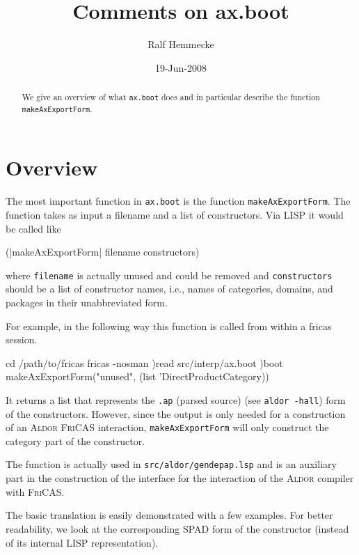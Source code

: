 \documentclass{article}
\newcommand{\file}[1]{\texttt{#1}}
\newcommand{\xAldor}{\textsc{Aldor}}
\newcommand{\xFriCAS}{\textsc{FriCAS}}
\begin{document}
\title{Comments on ax.boot}
\author{Ralf Hemmecke}
\date{19-Jun-2008}
\maketitle
\begin{abstract}
  We give an overview of what \file{ax.boot} does and in particular
  describe the function \verb'makeAxExportForm'.
\end{abstract}
\tableofcontents

\section{Overview}
The most important function in \file{ax.boot} is the function
\verb'makeAxExportForm'.
%
The function takes as input a filename and a list of constructors.
Via LISP it would be called like
\begin{code}
(|makeAxExportForm| filename constructors)
\end{code}
where \verb'filename' is actually unused and could be removed and
\verb'constructors' should be a list of constructor names, i.e., names
of categories, domains, and packages in their unabbreviated form.

For example, in the following way this function is called from within
a fricas session.
\begin{code}
cd /path/to/fricas
fricas -nosman
)read src/interp/ax.boot
)boot makeAxExportForm("unused", (list 'DirectProductCategory))
\end{code}

It returns a list that represents the \texttt{.ap} (parsed source)
(see \verb'aldor -hall') form of the constructors. However, since the
output is only needed for a construction of an \xAldor{} \xFriCAS{}
interaction, \verb'makeAxExportForm' will only construct the category
part of the constructor.

The function is actually used in \file{src/aldor/gendepap.lsp} and is an
auxiliary part in the construction of the interface for the
interaction of the \xAldor{} compiler with \xFriCAS{}.



The basic translation is easily demonstrated with a few examples. For
better readability, we look at the corresponding SPAD form of the
constructor (instead of its internal LISP representation).
\end{document}

